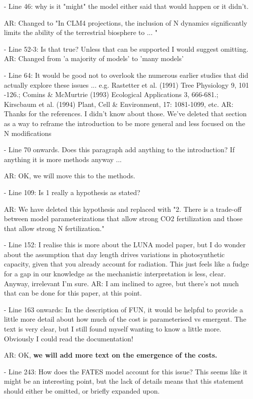 \documentclass{article}
\begin{document}
- Line 46: why is it "might" the model either said that would happen or it didn't. 

\textsf{AR: Changed to "In CLM4 projections, the inclusion of N dynamics significantly limits the ability of the terrestrial biosphere to ... "}

- Line 52-3: Is that true? Unless that can be supported I would suggest omitting. 
\textsf{AR: Changed from 'a majority of models' to 'many models'}

- Line 64: It would be good not to overlook the numerous earlier studies that did actually explore these issues ... e.g. Rastetter et al. (1991) Tree Physiology 9, 101 -126.; Comins \& McMurtrie (1993) Ecological Applications 3, 666-681.; Kirscbaum et al. (1994) Plant, Cell \& Environment, 17: 1081-1099, etc. 
\textsf{AR: Thanks for the references. I didn't know about those. We've deleted that section as a way to reframe the introduction to be more general and less focused on the N modifications}

- Line 70 onwards. Does this paragraph add anything to the introduction? If anything it is more methods anyway ... 

\textsf{AR: OK, we will move this to the methods. }

- Line 109: Is 1 really a hypothesis as stated? 

\textsf{AR: We have deleted this hypothesis and replaced with "2. There is a trade-off between model parameterizations that allow strong CO2 fertilization and those that allow strong N fertilization."}

- Line 152: I realise this is more about the LUNA model paper, but I do wonder about the assumption that day length drives variations in photosynthetic capacity, given that you already account for radiation. This just feels like a fudge for a gap in our knowledge as the mechanistic interpretation is less, clear. Anyway, irrelevant I'm sure. 
\textsf{AR: I am inclined to agree, but there's not much that can be done for this paper, at this point.} 

- Line 163 onwards: In the description of FUN, it would be helpful to provide a little more detail about how much of the cost is parameterised vs emergent. The text is very clear, but I still found myself wanting to know a little more. Obviously I could read the documentation! 

\textsf{AR: OK, \textbf{we will add more text on the emergence of the costs.}}

- Line 243: How does the FATES model account for this issue? This seems like it might be an interesting point, but the lack of details means that this statement should either be omitted, or briefly expanded upon. 
\end{document}
